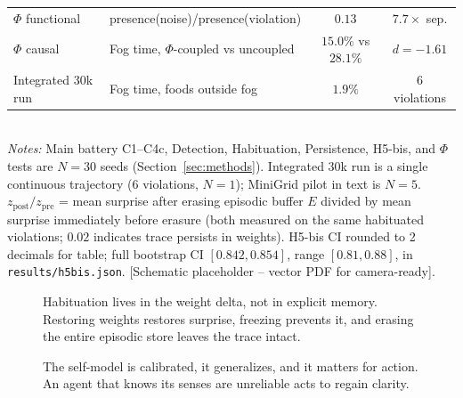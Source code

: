 \documentclass[11pt,a4paper]{article}
\begin{document}
\begin{table}[h]
\begin{tabular}{@{}llcc@{}}
$\Phi$ functional & presence(noise)/presence(violation) & $0.13$ & $7.7\times$ sep. \\
$\Phi$ causal & Fog time, $\Phi$-coupled vs uncoupled & $15.0\%$ vs $28.1\%$ & $d=-1.61$ \\
Integrated 30k run & Fog time, foods outside fog & $1.9\%$ & 6 violations \\
\bottomrule
\end{tabular}
\\[0.6ex]
{\small \textit{Notes:} Main battery C1--C4c, Detection, Habituation, Persistence, H5-bis, and $\Phi$ tests are $N=30$ seeds (Section~\ref{sec:methods}). Integrated 30k run is a single continuous trajectory (6 violations, $N=1$); MiniGrid pilot in text is $N=5$. $z_{\mathrm{post}}/z_{\mathrm{pre}}$ = mean surprise after erasing episodic buffer $E$ divided by mean surprise immediately before erasure (both measured on the same habituated violations; $0.02$ indicates trace persists in weights). H5-bis CI rounded to 2 decimals for table; full bootstrap CI $[0.842,0.854]$, range $[0.81,0.88]$, in \texttt{results/h5bis.json}. [Schematic placeholder -- vector PDF for camera-ready].}
\end{table}

\begin{figure}[h]
\centering
{}
\caption{Habituation lives in the weight delta, not in explicit memory. Restoring weights restores surprise, freezing prevents it, and erasing the entire episodic store leaves the trace intact.}
\label{fig:hab}
\end{figure}

\begin{figure}[h]
\centering
{}
\caption{The self-model is calibrated, it generalizes, and it matters for action. An agent that knows its senses are unreliable acts to regain clarity.}
\label{fig:phi}
\end{figure}
\end{document}
